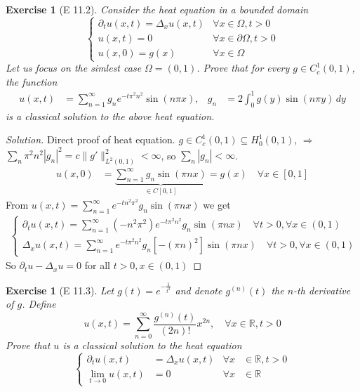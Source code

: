 \documentclass{report}
\theoremstyle{tommy}
\newtheorem{ex}[defn]{Exercise}
\begin{document}
\begin{ex}[E 11.2]
  Consider the heat equation in a bounded domain
  \[
    \begin{cases}
      \partial_t u(x,t) = \Delta_x u(x,t) & \forall x \in \Omega, t > 0 \\
      u(x,t) = 0 & \forall x \in \partial \Omega, t > 0 \\
      u(x,0) = g(x) & \forall x \in \Omega
    \end{cases}\]
    Let us focus on the simlest case \(\Omega = (0,1)\). Prove that for every \(g \in C_c^1(0,1)\), the function 
    \begin{align*}
      u(x,t) &= \sum_{n=1}^\infty g_n e^{-t \pi^2 n^2} \sin(n \pi x), & g_n &= 2 \int_0^1 g(y) \sin(n\pi y) \, dy
    \end{align*}
    is a classical solution to the above heat equation.
\end{ex}

\begin{proof}[Solution]
  Direct proof of heat equation. \(g \in C_c^1(0,1) \subseteq H_0^1(0,1)\), \(\Rightarrow\) \(\sum_n \pi^2 n^2 |g_n|^2 = c \|g'\|_{L^2(0,1)}^2 < \infty\), so \(\sum_n |g_n| < \infty\).
  \begin{align*}
    u(x,0) &= \underbrace{\sum_{n=1}^\infty g_n \sin(\pi n x)}_{\in C[0,1]} = g(x) \quad \forall x \in [0,1]
  \end{align*}
  From \(u(x,t) = \sum_{n=1}^\infty e^{-tn^2\pi^2} g_n \sin(\pi n x)\) we get 
  \begin{align*}
    \begin{cases}
      \partial_t u(x,t) = \sum_{n=1}^\infty (-n^2 \pi^2) e^{-t\pi^2 n^2} g_n \sin(\pi n x) \quad \forall t > 0, \forall x \in (0,1) \\
      \Delta_x u(x,t) = \sum_{n=1}^\infty e^{-t\pi^2 n^2} g_n[-(\pi n)^2] \sin(\pi n x) \quad \forall t > 0, \forall x \in (0,1)
    \end{cases}
  \end{align*}
  So \(\partial_t u - \Delta_x u = 0\) for all \(t > 0, x \in (0,1)\)
\end{proof}


\begin{ex}[E 11.3]
  Let \(g(t) = e^{-\frac{1}{t^2}}\) and denote \(g^{(n)}(t)\) the \(n\)-th derivative of \(g\). Define 
  \[u(x,t) = \sum_{n=0}^\infty \frac{g^{(n)}(t)}{(2n)!} x^{2n}, \quad \forall x \in \mathbb{R}, t > 0\]
  Prove that \(u\) is a classical solution to the heat equation 
  \[\left\{\begin{aligned}
    \partial_t u(x,t) &= \Delta_x u(x,t) &\forall x &\in \mathbb{R}, t > 0 \\
    \lim_{t \to 0} u(x,t) &= 0 &\forall x &\in \mathbb{R}
  \end{aligned}\right.\]
\end{ex}
\end{document}
